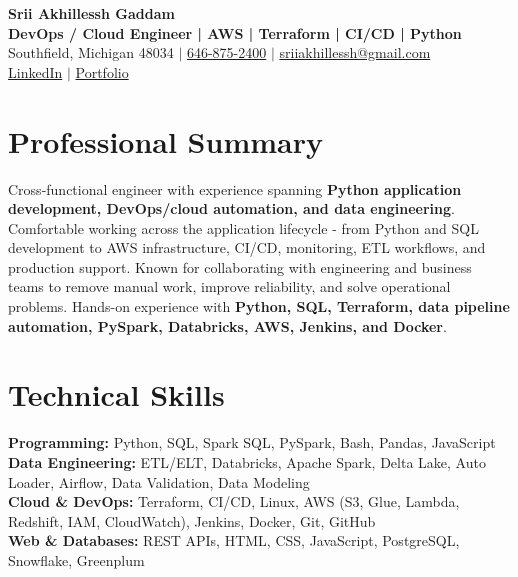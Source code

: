 \documentclass[letterpaper,10pt]{article}
\begin{document}
\fontsize{9.35pt}{10.45pt}\selectfont

\begin{center}
    {\LARGE \textbf{Srii Akhillessh Gaddam}} \\[-1pt]
    \textbf{DevOps / Cloud Engineer | AWS | Terraform | CI/CD | Python} \\[2pt]
    Southfield, Michigan 48034 $|$
    \href{tel:6468752400}{646-875-2400} $|$
    \href{mailto:sriiakhillessh@gmail.com}{sriiakhillessh@gmail.com} \\[1pt]
    \href{https://www.linkedin.com/in/srii-akhiilessh-gaddam-b48668191/}{LinkedIn} $|$
    \href{https://sriiakhillesshg.github.io/portfolio/}{Portfolio}
\end{center}
\vspace{-8pt}

\section{Professional Summary}
\small{Cross-functional engineer with experience spanning \textbf{Python application development, DevOps/cloud automation, and data engineering}. Comfortable working across the application lifecycle - from Python and SQL development to AWS infrastructure, CI/CD, monitoring, ETL workflows, and production support. Known for collaborating with engineering and business teams to remove manual work, improve reliability, and solve operational problems. Hands-on experience with \textbf{Python, SQL, Terraform, data pipeline automation, PySpark, Databricks, AWS, Jenkins, and Docker}.}

\section{Technical Skills}
\small{
\textbf{Programming:} Python, SQL, Spark SQL, PySpark, Bash, Pandas, JavaScript \\
\textbf{Data Engineering:} ETL/ELT, Databricks, Apache Spark, Delta Lake, Auto Loader, Airflow, Data Validation, Data Modeling \\
\textbf{Cloud \& DevOps:} Terraform, CI/CD, Linux, AWS (S3, Glue, Lambda, Redshift, IAM, CloudWatch), Jenkins, Docker, Git, GitHub \\
\textbf{Web \& Databases:} REST APIs, HTML, CSS, JavaScript, PostgreSQL, Snowflake, Greenplum
}
\end{document}
